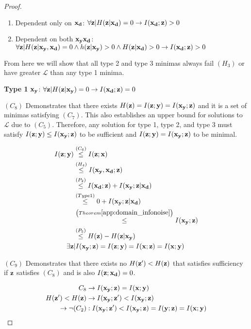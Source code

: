 \begin{theorem}
\begin{proof}
\begin{enumerate}
    \item Dependent only on ${\mathbf{x}}_{\mathbf{d}}$: $\forall {\mathbf{z}}|H({\mathbf{z}}| {\mathbf{x}}_{\mathbf{d}})=0 \rightarrow I({\mathbf{x}}_{\mathbf{d}}; {\mathbf{z}}) > 0$

    \item Dependent on both ${\mathbf{x}}_{\mathbf{y}} {\mathbf{x}}_{\mathbf{d}}$: $\forall {\mathbf{z}}|H({\mathbf{z}}|{\mathbf{x}}_{\mathbf{y}}, {\mathbf{x}}_{\mathbf{d}})=0 \land h({\mathbf{z}}| {\mathbf{x}}_{\mathbf{y}})>0 \land H({\mathbf{z}}| {\mathbf{x}}_{\mathbf{d}})>0 \rightarrow I({\mathbf{x}}_{\mathbf{d}}; {\mathbf{z}}) > 0$
\end{enumerate}

From here we will show that all type 2 and type 3 minimas always fail $(H_3)$ or have greater $\mathcal{L}$ than any type 1 minima.

\textbf{Type 1} ${\mathbf{x}}_{\mathbf{y}}$: $\forall {\mathbf{z}}|H({\mathbf{z}}| {\mathbf{x}}_{\mathbf{y}})=0 \rightarrow I({\mathbf{x}}_{\mathbf{d}}; {\mathbf{z}}) = 0$

$(C_8)$ Demonstrates that there exists $H({\mathbf{z}}) = I({\mathbf{z}}; {\mathbf{y}}) = I({\mathbf{x}}_{\mathbf{y}}; {\mathbf{z}})$ and it is a set of minimas satisfying $(C_7)$. This also establishes an upper bound for solutions to $\mathcal{L}$ due to $(C_5)$. Therefore, any solution for type 1, type 2, and type 3 must satisfy $I({\mathbf{z}}; {\mathbf{y}}) \leq I({\mathbf{x}}_{\mathbf{y}}; {\mathbf{z}})$ to be sufficient and $I({\mathbf{z}}; {\mathbf{y}}) = I({\mathbf{x}}_{\mathbf{y}}; {\mathbf{z}})$ to be minimal.

$$
\begin{aligned}
    I({\mathbf{z}}; {\mathbf{y}})&\stackrel{\left(C_6\right)}{\leq} I({\mathbf{z}}; {\mathbf{x}})  \\
    &\stackrel{\left(H_4\right)}{\leq}  I({\mathbf{x}}_{\mathbf{y}}, {\mathbf{x}}_{\mathbf{d}}; {\mathbf{z}}) \\
    &\stackrel{\left(P_2\right)}{\leq} I({\mathbf{x}}_{\mathbf{d}}; {\mathbf{z}}) + I({\mathbf{x}}_{\mathbf{y}}; {\mathbf{z}}| {\mathbf{x}}_{\mathbf{d}})\\
    &\stackrel{\left(Type1\right)}{\leq} 0 + I({\mathbf{x}}_{\mathbf{y}}; {\mathbf{z}}| {\mathbf{x}}_{\mathbf{d}})\\
    &\stackrel{\left(Theorem\ref{app:domain_infonoise}\right)}{\leq} I({\mathbf{x}}_{\mathbf{y}}; {\mathbf{z}})\\
    &\stackrel{\left(P_5\right)}{\leq} H({\mathbf{z}}) - H({\mathbf{z}}| {\mathbf{x}}_{\mathbf{y}})\\
    \exists {\mathbf{z}} &|I({\mathbf{x}}_{\mathbf{y}}; {\mathbf{z}})  = I({\mathbf{z}}; {\mathbf{y}}) = I({\mathbf{x}}; {\mathbf{z}}) = I({\mathbf{x}}; {\mathbf{y}})
\end{aligned}
$$

$(C_{9})$ Demonstrates that there exists no $H({\mathbf{z}}') < H({\mathbf{z}})$ that satisfies sufficiency if ${\mathbf{z}}$ satisfies $(C_8)$ and is also $I({\mathbf{z}}; {\mathbf{x}}_{\mathbf{d}}) = 0$.

$$
\begin{aligned}
    C_8 &\rightarrow  I({\mathbf{x}}_{\mathbf{y}}; {\mathbf{z}}) = I({\mathbf{x}}; {\mathbf{y}})\\
    H({\mathbf{z}}') < H({\mathbf{z}}) & \rightarrow I({\mathbf{x}}_{\mathbf{y}}; {\mathbf{z}}') < I({\mathbf{x}}_{\mathbf{y}}; {\mathbf{z}}) \\
    \rightarrow \neg (C_2) &: I({\mathbf{x}}_{\mathbf{y}}; {\mathbf{z}}') < I({\mathbf{x}}_{\mathbf{y}}; {\mathbf{z}}) = I({\mathbf{y}}; {\mathbf{z}}) = I({\mathbf{x}}; {\mathbf{y}})
\end{aligned}
$$


\end{proof}
\end{theorem}
